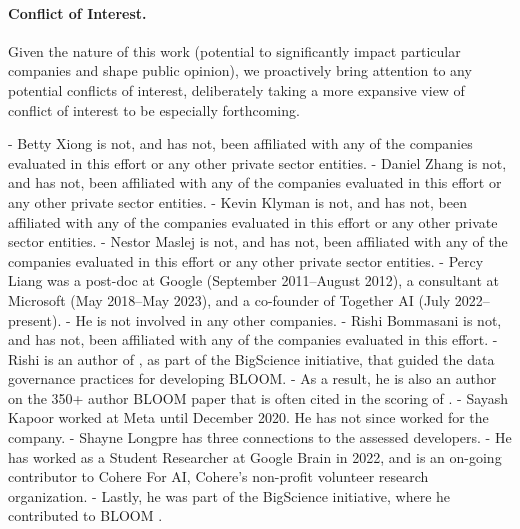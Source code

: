 \paragraph{Conflict of Interest.}
Given the nature of this work (\eg potential to significantly impact particular companies and shape public opinion), we proactively bring attention to any potential conflicts of interest, deliberately taking a more expansive view of conflict of interest to be especially forthcoming.

-  Betty Xiong is not, and has not, been affiliated with any of the companies evaluated in this effort or any other private sector entities.
-  Daniel Zhang is not, and has not, been affiliated with any of the companies evaluated in this effort or any other private sector entities.
-  Kevin Klyman is not, and has not, been affiliated with any of the companies evaluated in this effort or any other private sector entities.
-  Nestor Maslej is not, and has not, been affiliated with any of the companies evaluated in this effort or any other private sector entities.
-  Percy Liang was a post-doc at Google (September 2011--August 2012), a consultant at Microsoft (May 2018--May 2023), and a co-founder of Together AI (July 2022--present).
- He is not involved in any other companies.
-  Rishi Bommasani is not, and has not, been affiliated with any of the companies evaluated in this effort.
- Rishi is an author of \citet{jernite2022governance}, as part of the BigScience initiative, that guided the data governance practices for developing BLOOM.
- As a result, he is also an author on the 350+ author BLOOM paper \citep{scao2022bloom} that is often cited in the scoring of \bloomz.
-  Sayash Kapoor worked at Meta until December 2020. He has not since worked for the company.
-  Shayne Longpre has three connections to the assessed developers.
- He has worked as a Student Researcher at Google Brain in 2022, and is an on-going contributor to Cohere For AI, Cohere's non-profit volunteer research organization.
- Lastly, he was part of the BigScience initiative, where he contributed to BLOOM \citep{scao2022bloom}.